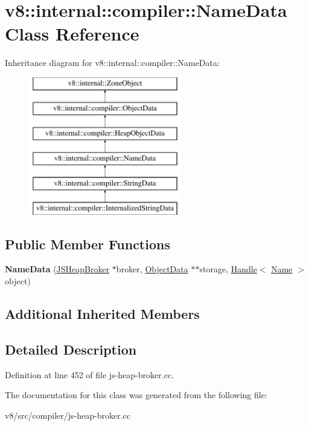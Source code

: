 \hypertarget{classv8_1_1internal_1_1compiler_1_1NameData}{}\section{v8\+:\+:internal\+:\+:compiler\+:\+:Name\+Data Class Reference}
\label{classv8_1_1internal_1_1compiler_1_1NameData}
Inheritance diagram for v8\+:\+:internal\+:\+:compiler\+:\+:Name\+Data\+:\begin{figure}[H]
\begin{center}
\leavevmode
\includegraphics[height=6.000000cm]{classv8_1_1internal_1_1compiler_1_1NameData}
\end{center}
\end{figure}
\subsection*{Public Member Functions}
\begin{DoxyCompactItemize}
\item 
\mbox{\label{classv8_1_1internal_1_1compiler_1_1NameData_a51d8682cd44aab514e46bca55ef2bdd9}} 
{\bfseries Name\+Data} (\mbox{\hyperlink{classv8_1_1internal_1_1compiler_1_1JSHeapBroker}{J\+S\+Heap\+Broker}} $\ast$broker, \mbox{\hyperlink{classv8_1_1internal_1_1compiler_1_1ObjectData}{Object\+Data}} $\ast$$\ast$storage, \mbox{\hyperlink{classv8_1_1internal_1_1Handle}{Handle}}$<$ \mbox{\hyperlink{classv8_1_1internal_1_1Name}{Name}} $>$ object)
\end{DoxyCompactItemize}
\subsection*{Additional Inherited Members}


\subsection{Detailed Description}


Definition at line 452 of file js-\/heap-\/broker.\+cc.



The documentation for this class was generated from the following file\+:\begin{DoxyCompactItemize}
\item 
v8/src/compiler/js-\/heap-\/broker.\+cc\end{DoxyCompactItemize}
